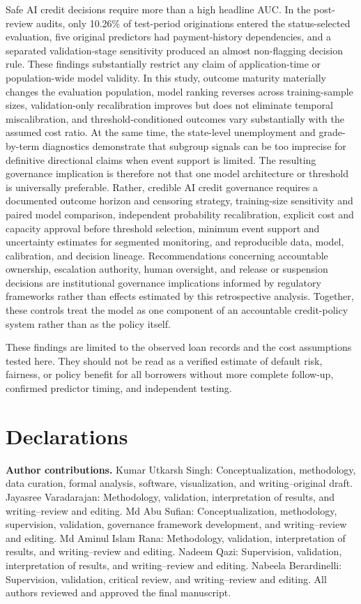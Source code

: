 \documentclass[10pt]{article}
\begin{document}
Safe AI credit decisions require more than a high headline AUC. In the post-review audits, only 10.26\% of test-period originations entered the status-selected evaluation, five original predictors had payment-history dependencies, and a separated validation-stage sensitivity produced an almost non-flagging decision rule. These findings substantially restrict any claim of application-time or population-wide model validity. In this study, outcome maturity materially changes the evaluation population, model ranking reverses across training-sample sizes, validation-only recalibration improves but does not eliminate temporal miscalibration, and threshold-conditioned outcomes vary substantially with the assumed cost ratio. At the same time, the state-level unemployment and grade-by-term diagnostics demonstrate that subgroup signals can be too imprecise for definitive directional claims when event support is limited. The resulting governance implication is therefore not that one model architecture or threshold is universally preferable. Rather, credible AI credit governance requires a documented outcome horizon and censoring strategy, training-size sensitivity and paired model comparison, independent probability recalibration, explicit cost and capacity approval before threshold selection, minimum event support and uncertainty estimates for segmented monitoring, and reproducible data, model, calibration, and decision lineage. Recommendations concerning accountable ownership, escalation authority, human oversight, and release or suspension decisions are institutional governance implications informed by regulatory frameworks rather than effects estimated by this retrospective analysis. Together, these controls treat the model as one component of an accountable credit-policy system rather than as the policy itself.

These findings are limited to the observed loan records and the cost assumptions tested here. They should not be read as a verified estimate of default risk, fairness, or policy benefit for all borrowers without more complete follow-up, confirmed predictor timing, and independent testing.

 \section*{Declarations}

 \noindent\textbf{Author contributions.}
 Kumar Utkarsh Singh: Conceptualization, methodology, data curation, formal analysis, software, visualization, and writing--original draft.
 Jayasree Varadarajan: Methodology, validation, interpretation of results, and writing--review and editing.
 Md Abu Sufian: Conceptualization, methodology, supervision, validation, governance framework development, and writing--review and editing.
 Md Aminul Islam Rana: Methodology, validation, interpretation of results, and writing--review and editing.
 Nadeem Qazi: Supervision, validation, interpretation of results, and writing--review and editing.
 Nabeela Berardinelli: Supervision, validation, critical review, and writing--review and editing.
 All authors reviewed and approved the final manuscript.
\end{document}
